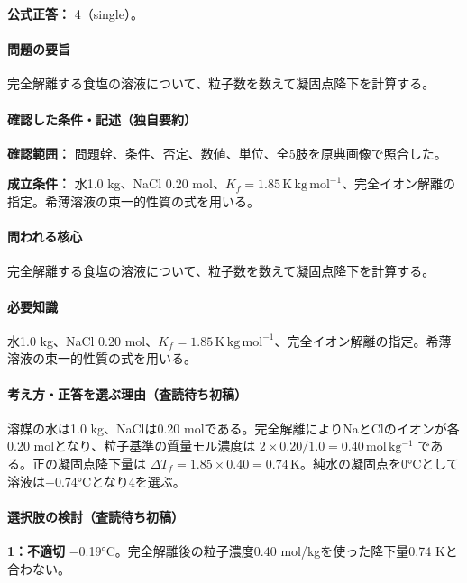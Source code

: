 \textbf{公式正答：} 4（single）。

\paragraph{問題の要旨} 完全解離する食塩の溶液について、粒子数を数えて凝固点降下を計算する。

\paragraph{確認した条件・記述（独自要約）}\mbox{}\par

\noindent\textbf{確認範囲：} 問題幹、条件、否定、数値、単位、全5肢を原典画像で照合した。\par

\noindent\textbf{成立条件：} 水1.0 kg、NaCl 0.20 mol、\(K_f=1.85\,\mathrm{K\,kg\,mol^{-1}}\)、完全イオン解離の指定。希薄溶液の束一的性質の式を用いる。\par

\paragraph{問われる核心} 完全解離する食塩の溶液について、粒子数を数えて凝固点降下を計算する。

\paragraph{必要知識} 水1.0 kg、NaCl 0.20 mol、\(K_f=1.85\,\mathrm{K\,kg\,mol^{-1}}\)、完全イオン解離の指定。希薄溶液の束一的性質の式を用いる。

\paragraph{考え方・正答を選ぶ理由（査読待ち初稿）} 溶媒の水は1.0 kg、NaClは0.20 molである。完全解離によりNaとClのイオンが各0.20 molとなり、粒子基準の質量モル濃度は \(2\times0.20/1.0=0.40\,\mathrm{mol\,kg^{-1}}\) である。正の凝固点降下量は \(\Delta T_f=1.85\times0.40=0.74\,\mathrm K\)。純水の凝固点を0°Cとして溶液は−0.74°Cとなり4を選ぶ。

\paragraph{選択肢の検討（査読待ち初稿）}\mbox{}\par

\noindent\textbf{1：不適切} −0.19°C。完全解離後の粒子濃度0.40 mol/kgを使った降下量0.74 Kと合わない。\par

